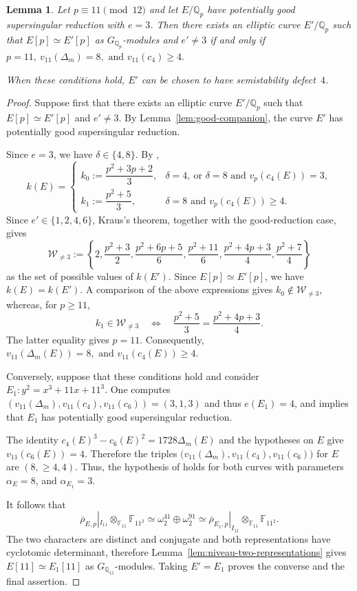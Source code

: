 \documentclass[12pt]{amsart}
\numberwithin{equation}{section}
\newtheorem{lemma}[equation]{Lemma}
\theoremstyle{definition}
\newcommand{\F}{\mathbb{F}}
\newcommand{\Q}{\mathbb{Q}}
\newcommand{\rhobar}{{\overline{\rho}}}
\begin{document}
\begin{lemma}\label{lem:e3-cross-defect}
Let $p\equiv11\pmod{12}$ and let $E/\Q_p$ have potentially good
supersingular reduction with $e=3$. Then there exists an elliptic
curve $E'/\Q_p$ such that
\(E[p]\simeq E'[p]\)
as $G_{\Q_p}$-modules and $e'\neq3$ if and only if
\(
 p=11, \:v_{11}(\Delta_m)=8,
 \text{ and } v_{11}(c_4)\geq4.
\)

When these conditions hold, $E'$ can be chosen to have semistability
defect~$4$.
\end{lemma}

 \begin{proof}
Suppose first that there exists an elliptic curve $E'/\Q_p$ such that
\( E[p]\simeq E'[p] \)
and $e'\neq3$. By Lemma~\ref{lem:good-companion}, the curve $E'$
has potentially good supersingular reduction.

Since $e=3$, we have $\delta\in\{4,8\}$. By
\cite[Th\'eor\`eme~1]{Kraus1997,Kraus},
\[
 k(E)=
 \begin{cases}
 k_0:=\dfrac{p^2+3p+2}{3},
 & \delta=4,\ \text{or }\delta=8
   \text{ and }v_p(c_4(E))=3,\\[2mm]
 k_1:=\dfrac{p^2+5}{3},
 & \delta=8\text{ and }v_p(c_4(E))\geq4.
 \end{cases}
\]
Since $e'\in\{1,2,4,6\}$, Kraus's theorem, together with the
good-reduction case, gives
\[
 \mathcal W_{\neq3}:=
 \left\{
 2,\frac{p^2+3}{2},
 \frac{p^2+6p+5}{6},\frac{p^2+11}{6},
 \frac{p^2+4p+3}{4},\frac{p^2+7}{4}
 \right\}
\]
as the set of possible values of $k(E')$. Since
$E[p]\simeq E'[p]$, we have $k(E)=k(E')$. A comparison of the
above expressions gives
         $k_0\notin\mathcal W_{\neq3}$,
whereas, for $p\geq11$,
\[
 k_1\in\mathcal W_{\neq3}
 \quad\Longleftrightarrow\quad
 \frac{p^2+5}{3}=\frac{p^2+4p+3}{4}.
\]
The latter equality gives $p=11$.
Consequently,
\(v_{11}(\Delta_m(E))=8,
 \text{ and } v_{11}(c_4(E))\geq4.\)

Conversely, suppose that these conditions hold and consider
\(
E_1 : y^2=x^3+11x+11^3.
\)
One computes $(v_{11}(\Delta_m),v_{11}(c_4),v_{11}(c_6))=(3,1,3)$ and thus $e(E_1)=4$, and \cite[Lemme~1(b)]{Kraus1997} implies that $E_1$ has potentially good supersingular reduction.

The identity
$c_4(E)^3-c_6(E)^2=1728\Delta_m(E)$
and the hypotheses on $E$ give $v_{11}(c_6(E))=4$. Therefore the
triples
$\bigl(v_{11}(\Delta_m),v_{11}(c_4),v_{11}(c_6)\bigr)$
for $E$ are $(8,\geq4,4)$.
Thus, the hypothesis of
\cite[Proposition~2(b)]{Kraus1997} holds for both curves with parameters $\alpha_E=8$, and $\alpha_{E_1}=3$.

It follows that
\[
 \rhobar_{E,p}|_{I_{11}}
 \otimes_{\F_{11}}\F_{11^2}
 \simeq
 \omega_2^{41}\oplus\omega_2^{91}
 \simeq
 \rhobar_{E_1,p}|_{I_{11}}
 \otimes_{\F_{11}}\F_{11^2}.
\]
The two characters are distinct and conjugate and both representations have cyclotomic determinant, therefore 
Lemma~\ref{lem:niveau-two-representations} gives
$E[11]\simeq E_1[11]$ as $G_{\Q_{11}}$-modules. Taking $E'=E_1$ proves the converse and the final assertion.
\end{proof}
\end{document}
